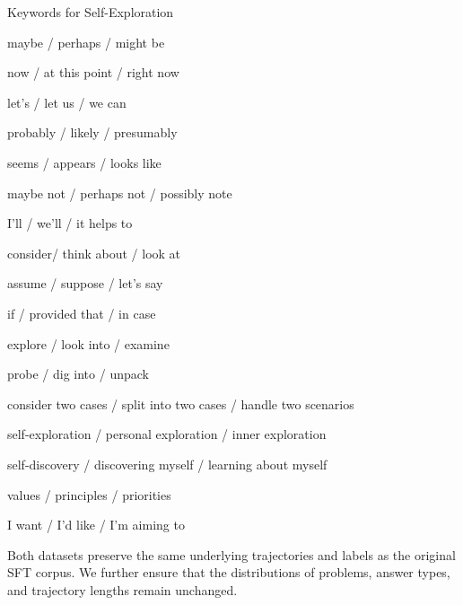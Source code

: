 \begin{PromptBox}{Keywords for Self-Exploration}

maybe / perhaps / might be

now / at this point / right now

let's / let us / we can

probably / likely / presumably

seems / appears / looks like

maybe not / perhaps not / possibly note

I’ll / we’ll / it helps to

consider/ think about / look at

assume / suppose / let's say

if / provided that / in case

explore / look into / examine

probe / dig into / unpack

consider two cases / split into two cases / handle two scenarios

self-exploration / personal exploration / inner exploration

self-discovery / discovering myself / learning about myself

values / principles / priorities

I want / I’d like / I’m aiming to
\end{PromptBox}
Both datasets preserve the same underlying trajectories and labels as the original SFT corpus. We further ensure that the distributions of problems, answer types, and trajectory lengths remain unchanged.


